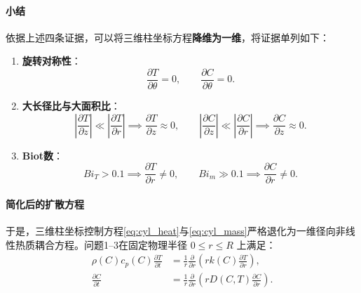 \documentclass[12pt,a4paper,fontset=none]{ctexart}
\begin{document}
\paragraph{小结}
依据上述四条证据，可以将三维柱坐标方程\textbf{降维为一维}，将证据单列如下：
\begin{enumerate}[label=(\arabic*)]
  \item \textbf{旋转对称性}：
  \begin{equation}
  \frac{\partial T}{\partial\theta} = 0,\qquad \frac{\partial C}{\partial\theta} = 0.\label{eq:theta_zero}
  \end{equation}
  \item \textbf{大长径比与大面积比}：
  \begin{equation}
  \left|\frac{\partial T}{\partial z}\right|\ll\left|\frac{\partial T}{\partial r}\right| \implies \frac{\partial T}{\partial z} \approx 0,\qquad
  \left|\frac{\partial C}{\partial z}\right|\ll\left|\frac{\partial C}{\partial r}\right| \implies \frac{\partial C}{\partial z} \approx 0.\label{eq:z_zero}
  \end{equation}
  \item \textbf{Biot数}：
  \begin{equation}
  Bi_T > 0.1 \implies \frac{\partial T}{\partial r} \neq 0,\qquad
  Bi_m \gg 0.1 \implies \frac{\partial C}{\partial r} \neq 0.\label{eq:r_nonzero}
  \end{equation}
\end{enumerate}

\paragraph{简化后的扩散方程}
于是，三维柱坐标控制方程\eqref{eq:cyl_heat}与\eqref{eq:cyl_mass}严格退化为一维径向非线性热质耦合方程。问题1--3在固定物理半径 $0\le r\le R$ 上满足：
\begin{align}
\rho(C)c_p(C)\frac{\partial T}{\partial t}
&=\frac1r\frac{\partial}{\partial r}\left(rk(C)\frac{\partial T}{\partial r}\right),\label{eq:heat}\\[10pt]
\frac{\partial C}{\partial t}
&=\frac1r\frac{\partial}{\partial r}\left(rD(C,T)\frac{\partial C}{\partial r}\right).\label{eq:mass}
\end{align}
\end{document}
